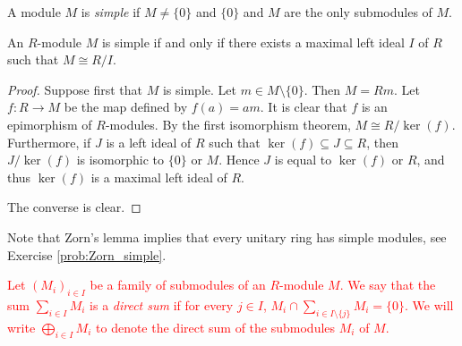 \begin{definition}
A module $M$ is \emph{simple} if $M\neq \{0\}$ and $\{0\}$ and $M$ are the only submodules of $M$.
\end{definition}

\begin{lemma}
\label{Lema 1.1.2}
An $R$-module $M$ is simple if and only if there exists a maximal left ideal $I$ of $R$ such that
$M\cong R/I$.
\end{lemma}

\begin{proof}
Suppose first that $M$ is simple. Let  $m\in M\setminus\{ 0\}$. Then $M=Rm$.
Let $f\colon R\rightarrow M$ be the map defined by $f(a)=am$. 
It is clear that $f$ is an epimorphism of $R$-modules. 
By the first isomorphism theorem, 
$M\cong R/\ker(f)$. 
Furthermore, if $J$ is a left ideal of
$R$ such that $\ker(f)\subseteq J\subseteq R$, then
$J/\ker(f)$ is isomorphic to $\{0\}$ or $M$. Hence $J$ is equal to
$\ker(f)$ or $R$, and thus $\ker(f)$ is a maximal left ideal of $R$.

The converse is clear. 
\end{proof}

Note that Zorn's lemma implies that every unitary ring has simple modules, see Exercise \ref{prob:Zorn_simple}. 

\textcolor{red}{
\begin{definition}
Let $(M_i)_{i\in I}$ be a family of submodules of an $R$-module $M$. We say that the sum $\sum_{i\in I}M_i$ is a {\em direct sum} if for every $j\in I$, $M_i\cap\sum_{i\in I\setminus\{ j\}}M_i=\{0\}$. We will write $\bigoplus_{i\in I}M_i$ to denote the direct sum of the submodules $M_i$ of $M$.
\end{definition}}

